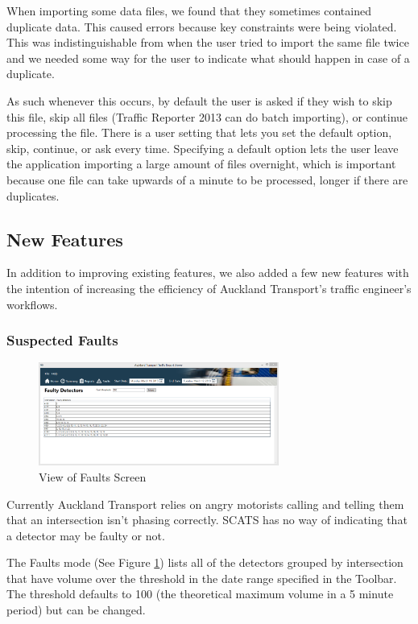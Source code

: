 \documentclass{article}
\begin{document}
When importing some data files, we found that they sometimes contained duplicate data. This caused errors because key constraints were being violated. This was indistinguishable from when the user tried to import the same file twice and we needed some way for the user to indicate what should happen in case of a duplicate. 

As such whenever this occurs, by default the user is asked if they wish to skip this file, skip all files (Traffic Reporter 2013 can do batch importing), or continue processing the file. There is a user setting that lets you set the default option, skip, continue, or ask every time. Specifying a default option lets the user leave the application importing a large amount of files overnight, which is important because one file can take upwards of a minute to be processed, longer if there are duplicates.

\subsection{New Features}

In addition to improving existing features, we also added a few new features with the intention of increasing the efficiency of Auckland Transport's traffic engineer's workflows.

\subsubsection{Suspected Faults}

\begin{figure}[!b]
\centerline{\includegraphics[width=3.1in]{faults}}
\caption{View of Faults Screen}
\label{fig:faults}
\end{figure}

Currently Auckland Transport relies on angry motorists calling and telling them that an intersection isn't phasing correctly. SCATS has no way of indicating that a detector may be faulty or not.

The Faults mode (See Figure \ref{fig:faults}) lists all of the detectors grouped by intersection that have volume over the threshold in the date range specified in the Toolbar. The threshold defaults to 100 (the theoretical maximum volume in a 5 minute period) but can be changed.
\end{document}
